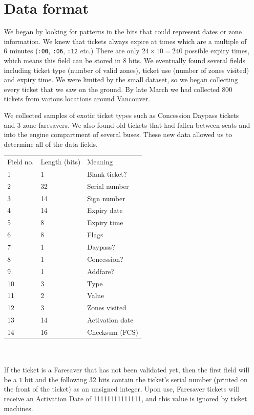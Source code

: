 \documentclass[fontsize=12pt]{scrartcl}
\begin{document}
\section{Data format}
We began by looking for patterns in the bits that could represent dates or zone information. We knew that tickets always expire at times which are a multiple of 6 minutes (\texttt{:00}, \texttt{:06}, \texttt{:12} etc.) There are only $24 \times 10 = 240$ possible expiry times, which means this field can be stored in 8 bits. We eventually found several fields including ticket type (number of valid zones), ticket use (number of zones visited) and expiry time. We were limited by the small dataset, so we began collecting every ticket that we saw on the ground. By late March we had collected 800 tickets from various locations around Vancouver.

We collected samples of exotic ticket types such as Concession Daypass tickets and 3-zone faresavers. We also found old tickets that had fallen between seats and into the engine compartment of several buses. These new data allowed us to determine all of the data fields.
\\

\begin{tabular}{lll}
    Field no. & Length (bits) & Meaning \\
    1  & 1  & Blank ticket? \\
    2  & 32 & Serial number \\
    3  & 14 & Sign number \\
    4  & 14 & Expiry date \\
    5  & 8  & Expiry time \\
    6  & 8  & Flags \\
    7  & 1  & Daypass? \\
    8  & 1  & Concession? \\
    9  & 1  & Addfare? \\
    10 & 3  & Type \\
    11 & 2  & Value \\
    12 & 3  & Zones visited \\
    13 & 14 & Activation date \\
    14 & 16 & Checksum (FCS)
\end{tabular}
\\
\\

If the ticket is a Faresaver that has not been validated yet, then the first field will be a \texttt{1} bit and the following 32 bits contain the ticket's serial number (printed on the front of the ticket) as an unsigned integer. Upon use, Faresaver tickets will receive an Activation Date of 11111111111111, and this value is ignored by ticket machines.
\end{document}
